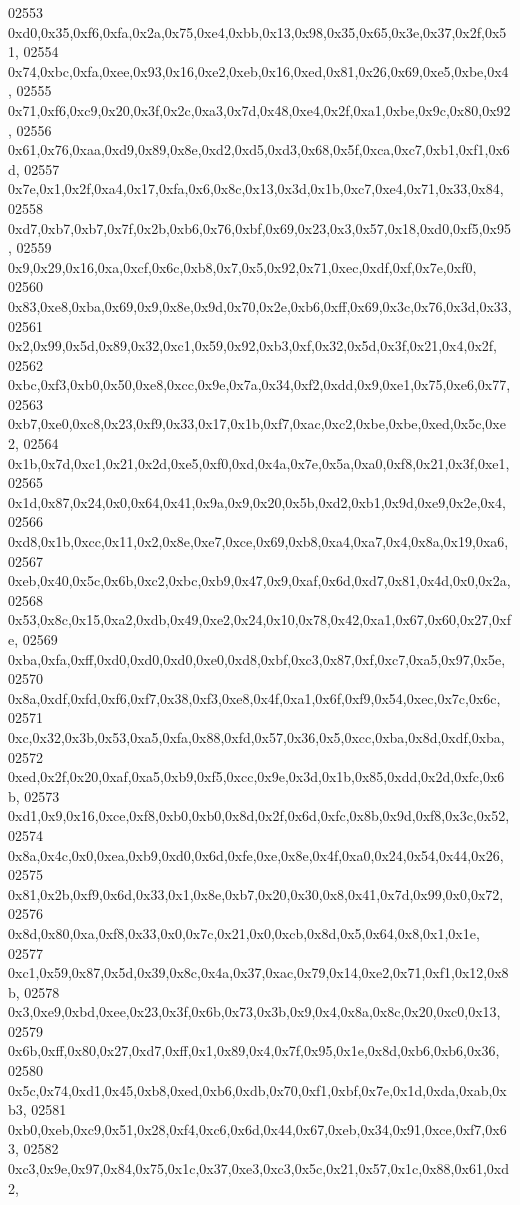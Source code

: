 \begin{DoxyCode}
02553   0xd0,0x35,0xf6,0xfa,0x2a,0x75,0xe4,0xbb,0x13,0x98,0x35,0x65,0x3e,0x37,0x2f,0x51,
02554   0x74,0xbc,0xfa,0xee,0x93,0x16,0xe2,0xeb,0x16,0xed,0x81,0x26,0x69,0xe5,0xbe,0x4,
02555   0x71,0xf6,0xc9,0x20,0x3f,0x2c,0xa3,0x7d,0x48,0xe4,0x2f,0xa1,0xbe,0x9c,0x80,0x92,
02556   0x61,0x76,0xaa,0xd9,0x89,0x8e,0xd2,0xd5,0xd3,0x68,0x5f,0xca,0xc7,0xb1,0xf1,0x6d,
02557   0x7e,0x1,0x2f,0xa4,0x17,0xfa,0x6,0x8c,0x13,0x3d,0x1b,0xc7,0xe4,0x71,0x33,0x84,
02558   0xd7,0xb7,0xb7,0x7f,0x2b,0xb6,0x76,0xbf,0x69,0x23,0x3,0x57,0x18,0xd0,0xf5,0x95,
02559   0x9,0x29,0x16,0xa,0xcf,0x6c,0xb8,0x7,0x5,0x92,0x71,0xec,0xdf,0xf,0x7e,0xf0,
02560   0x83,0xe8,0xba,0x69,0x9,0x8e,0x9d,0x70,0x2e,0xb6,0xff,0x69,0x3c,0x76,0x3d,0x33,
02561   0x2,0x99,0x5d,0x89,0x32,0xc1,0x59,0x92,0xb3,0xf,0x32,0x5d,0x3f,0x21,0x4,0x2f,
02562   0xbc,0xf3,0xb0,0x50,0xe8,0xcc,0x9e,0x7a,0x34,0xf2,0xdd,0x9,0xe1,0x75,0xe6,0x77,
02563   0xb7,0xe0,0xc8,0x23,0xf9,0x33,0x17,0x1b,0xf7,0xac,0xc2,0xbe,0xbe,0xed,0x5c,0xe2,
02564   0x1b,0x7d,0xc1,0x21,0x2d,0xe5,0xf0,0xd,0x4a,0x7e,0x5a,0xa0,0xf8,0x21,0x3f,0xe1,
02565   0x1d,0x87,0x24,0x0,0x64,0x41,0x9a,0x9,0x20,0x5b,0xd2,0xb1,0x9d,0xe9,0x2e,0x4,
02566   0xd8,0x1b,0xcc,0x11,0x2,0x8e,0xe7,0xce,0x69,0xb8,0xa4,0xa7,0x4,0x8a,0x19,0xa6,
02567   0xeb,0x40,0x5c,0x6b,0xc2,0xbc,0xb9,0x47,0x9,0xaf,0x6d,0xd7,0x81,0x4d,0x0,0x2a,
02568   0x53,0x8c,0x15,0xa2,0xdb,0x49,0xe2,0x24,0x10,0x78,0x42,0xa1,0x67,0x60,0x27,0xfe,
02569   0xba,0xfa,0xff,0xd0,0xd0,0xd0,0xe0,0xd8,0xbf,0xc3,0x87,0xf,0xc7,0xa5,0x97,0x5e,
02570   0x8a,0xdf,0xfd,0xf6,0xf7,0x38,0xf3,0xe8,0x4f,0xa1,0x6f,0xf9,0x54,0xec,0x7c,0x6c,
02571   0xc,0x32,0x3b,0x53,0xa5,0xfa,0x88,0xfd,0x57,0x36,0x5,0xcc,0xba,0x8d,0xdf,0xba,
02572   0xed,0x2f,0x20,0xaf,0xa5,0xb9,0xf5,0xcc,0x9e,0x3d,0x1b,0x85,0xdd,0x2d,0xfc,0x6b,
02573   0xd1,0x9,0x16,0xce,0xf8,0xb0,0xb0,0x8d,0x2f,0x6d,0xfc,0x8b,0x9d,0xf8,0x3c,0x52,
02574   0x8a,0x4c,0x0,0xea,0xb9,0xd0,0x6d,0xfe,0xe,0x8e,0x4f,0xa0,0x24,0x54,0x44,0x26,
02575   0x81,0x2b,0xf9,0x6d,0x33,0x1,0x8e,0xb7,0x20,0x30,0x8,0x41,0x7d,0x99,0x0,0x72,
02576   0x8d,0x80,0xa,0xf8,0x33,0x0,0x7c,0x21,0x0,0xcb,0x8d,0x5,0x64,0x8,0x1,0x1e,
02577   0xc1,0x59,0x87,0x5d,0x39,0x8c,0x4a,0x37,0xac,0x79,0x14,0xe2,0x71,0xf1,0x12,0x8b,
02578   0x3,0xe9,0xbd,0xee,0x23,0x3f,0x6b,0x73,0x3b,0x9,0x4,0x8a,0x8c,0x20,0xc0,0x13,
02579   0x6b,0xff,0x80,0x27,0xd7,0xff,0x1,0x89,0x4,0x7f,0x95,0x1e,0x8d,0xb6,0xb6,0x36,
02580   0x5c,0x74,0xd1,0x45,0xb8,0xed,0xb6,0xdb,0x70,0xf1,0xbf,0x7e,0x1d,0xda,0xab,0xb3,
02581   0xb0,0xeb,0xc9,0x51,0x28,0xf4,0xc6,0x6d,0x44,0x67,0xeb,0x34,0x91,0xce,0xf7,0x63,
02582   0xc3,0x9e,0x97,0x84,0x75,0x1c,0x37,0xe3,0xc3,0x5c,0x21,0x57,0x1c,0x88,0x61,0xd2,

\end{DoxyCode}
